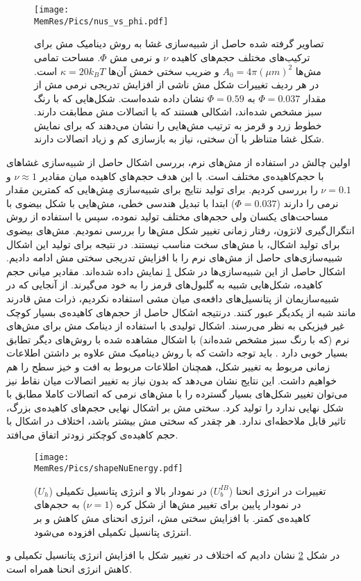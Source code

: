 \begin{figure}[htbp]
\begin{center}
\texttt{[image: \\MemRes/Pics/nus\_vs\_phi.pdf]}
\caption{
تصاویر گرفته شده حاصل از شبیه‌سازی غشا به روش دینامیک مش برای ترکیب‌های مختلف حجم‌های کاهیده‌
 $\nu$
و نرمی مش
$\Phi$.
مساحت تمامی‌ مش‌ها 
$A_0=4\pi (\mu m)^2$
و ضریب سختی خمش آن‌ها
$\kappa=20k_BT$
است. در هر ردیف تغییرات شکل مش ناشی از افزایش تدریجی نرمی مش از مقدار
$\Phi=0.037$
به
$\Phi=0.59$
نشان داده شده‌است. شکل‌هایی که با رنگ سبز مشخص شده‌اند، اشکالی هستند که با اتصالات مش مطابقت دارند. خطوط زرد و قرمز به ترتیب مش‌هایی را نشان می‌دهند که برای نمایش شکل غشا متناظر با آن سختی، نیاز به بازسازی کم و زیاد اتصالات دارند.
}
\label{fig:nuShapes}
\end{center}
\end{figure}

اولین چالش  در استفاده از مش‌های نرم، بررسی اشکال حاصل از شبیه‌سازی غشاهای با حجم‌کاهیده‌ی مختلف است. با این هدف حجم‌های کاهیده‌ میان مقادیر
$\nu \approx 1$
و
 $\nu = 0.1$
را بررسی کردیم. برای تولید نتایج برای شبیه‌سازی مِش‌هایی که کمترین مقدار نرمی را دارند
($\Phi=0.037$)
ابتدا با تبدیل هندسی خطی، مش‌هایی با شکل بیضوی با مساحت‌های یکسان ولی حجم‌های مختلف تولید نموده، سپس با استفاده از روش انتگرال‌گیری لانژون، رفتار زمانی تغییر شکل مش‌ها را بررسی نمودیم. مش‌های بیضوی برای تولید اشکال، با مش‌های سخت مناسب نیستند. در نتیجه برای تولید این اشکال شبیه‌سازی‌های حاصل از مش‌های نرم را با افزایش تدریجی سختی مش ادامه دادیم. اشکال حاصل از این شبیه‌سازی‌ها در شکل
\ref{fig:nuShapes}
نمایش داده‌ شده‌اند. مقادیر میانی حجم کاهیده، شکل‌هایی شبیه به گلبول‌های قرمز را به خود می‌گیرند. از آنجایی که در شبیه‌سازیمان از پتانسیل‌های دافعه‌ی میان مشی استفاده نکردیم، ذرات مش‌ قادرند مانند شبه  از یکدیگر عبور کنند. درنتیجه اشکال حاصل از حجم‌های کاهیده‌ی بسیار کوچک غیر فیزیکی به نظر می‌رسند. اشکال تولیدی با استفاده از دینامک مش برای مش‌های نرم (که با رنگ سبز مشخص شده‌اند) با اشکال مشاهده شده با روش‌های دیگر تطابق بسیار خوبی دارد
\cite{Peskin972JourCompPhys, Thomas1979AIAA, Chimera1986, Drabik2016, BIAN2020}.
باید توجه داشت که با روش دینامیک مش علاوه بر داشتن اطلاعات زمانی مربوط به تغییر شکل، همچنان اطلاعات مربوط به افت و خیز سطح را هم خواهیم داشت. این نتایج نشان می‌دهد که بدون نیاز به تغییر اتصالات میان نقاط نیز می‌توان تغییر شکل‌های بسیار گسترده را با مش‌های نرمی که اتصالات کاملا مطابق با شکل نهایی ندارد را تولید کرد. سختی مش بر اشکال نهایی حجم‌های کاهیده‌ی بزرگ، تاثیر قابل ملاحظه‌ای ندارد. هر چقدر که سختی مش بیشتر باشد، اختلاف در اشکال با حجم کاهیده‌ی کوچکتر زودتر اتفاق می‌افتد.

\begin{figure}[h]
\begin{center}
\texttt{[image: \\MemRes/Pics/shapeNuEnergy.pdf]}
\caption{
تغییرات در انرژی انحنا 
($U_b^{IB}$)
در نمودار بالا و انرژی پتانسیل تکمیلی
($U_h$)
در نمودار پایین برای تغییر مش‌ها از شکل کره
($\nu=1$)
به حجم‌های کاهیده‌ی کمتر. با افزایش سختی مش، انرژی انحنای مش کاهش و بر انترژی پتانسیل تکمیلی افزوده می‌شود.
}
\label{fig:UhvsNu}
\end{center}
\end{figure}


در شکل 
\ref{fig:UhvsNu}
نشان دادیم که اختلاف در تغییر شکل با افزایش انرژی پتانسیل تکمیلی و کاهش انرژی انحنا همراه است.


